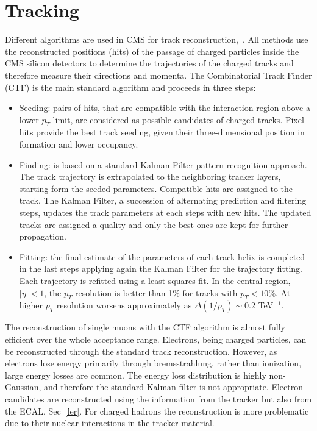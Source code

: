 \section{Tracking}
Different algorithms are used in CMS for track reconstruction,~\cite{Chatrchyan:2014fea, Adam:2005cg}.
All   methods   use   the   reconstructed positions (hits) of the passage of charged
particles inside the CMS silicon detectors to determine the
trajectories of the charged tracks and therefore measure their directions and momenta.  
The Combinatorial Track Finder (CTF) is the main standard algorithm and proceeds in three steps:
\begin{itemize} 
\item Seeding:  pairs of hits, that are compatible with the interaction region above a lower
$p_T$ limit, are considered as possible candidates of
charged tracks.  Pixel hits provide the best track
seeding, given their three-dimensional position in formation and lower occupancy.  
\item Finding: is based on a standard Kalman  Filter  pattern  recognition  approach.
The  track trajectory  is  extrapolated  to  the  neighboring tracker  layers, starting form the seeded parameters.
Compatible  hits  are  assigned to the track. 
The Kalman Filter, a  succession of  alternating  prediction  and  filtering  steps, 
updates the track parameters at each steps with new hits.
 The updated tracks are assigned a quality and only the best ones are kept for further propagation. 
\item Fitting: the  final  estimate  of  the   parameters  of
each  track  helix  is  completed  in  the  last  steps
applying again the Kalman Filter for the trajectory fitting.  Each trajectory is refitted using a
least-squares fit. In the central region, $|\eta|<1$, the $p_T$ resolution is better than 1\%  for tracks with $p_T<10\%$. At higher $p_T$ resolution worsens approximately as $\Delta (1/p_T) \sim 0.2$ TeV$^{-1}$.
\end{itemize}
The  reconstruction  of  single  muons  with  the
CTF  algorithm  is  almost  fully  efficient  over  the whole acceptance range.
Electrons, being charged particles, can be reconstructed through the standard track reconstruction.  However,  as electrons lose energy primarily through bremsstrahlung,  rather than ionization,  large energy losses are common.  
 The energy loss distribution is highly non-Gaussian, and therefore the standard Kalman filter is not appropriate.
Electron candidates are reconstructed using the  information from the tracker but also from
the ECAL, Sec~\ref{ler}. 
For charged hadrons the reconstruction is more problematic due to their nuclear
interactions  in  the  tracker  material. 


